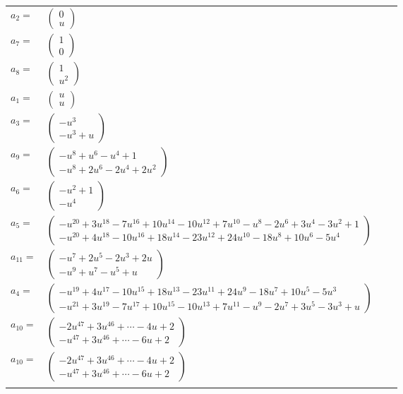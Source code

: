 \documentclass[1p]{elsarticle_modified}
\theoremstyle{definition}
\begin{document}
\begin{tabular}{m{7pt} m{180pt} m{7pt} m{180pt} }
\flushright $a_{2}=$&$\begin{pmatrix}0\\u\end{pmatrix}$ \\
\flushright $a_{7}=$&$\begin{pmatrix}1\\0\end{pmatrix}$ \\
\flushright $a_{8}=$&$\begin{pmatrix}1\\u^2\end{pmatrix}$ \\
\flushright $a_{1}=$&$\begin{pmatrix}u\\u\end{pmatrix}$ \\
\flushright $a_{3}=$&$\begin{pmatrix}- u^3\\- u^3+u\end{pmatrix}$ \\
\flushright $a_{9}=$&$\begin{pmatrix}- u^8+u^6- u^4+1\\- u^8+2 u^6-2 u^4+2 u^2\end{pmatrix}$ \\
\flushright $a_{6}=$&$\begin{pmatrix}- u^2+1\\- u^4\end{pmatrix}$ \\
\flushright $a_{5}=$&$\begin{pmatrix}- u^{20}+3 u^{18}-7 u^{16}+10 u^{14}-10 u^{12}+7 u^{10}- u^8-2 u^6+3 u^4-3 u^2+1\\- u^{20}+4 u^{18}-10 u^{16}+18 u^{14}-23 u^{12}+24 u^{10}-18 u^8+10 u^6-5 u^4\end{pmatrix}$ \\
\flushright $a_{11}=$&$\begin{pmatrix}- u^7+2 u^5-2 u^3+2 u\\- u^9+u^7- u^5+u\end{pmatrix}$ \\
\flushright $a_{4}=$&$\begin{pmatrix}- u^{19}+4 u^{17}-10 u^{15}+18 u^{13}-23 u^{11}+24 u^9-18 u^7+10 u^5-5 u^3\\- u^{21}+3 u^{19}-7 u^{17}+10 u^{15}-10 u^{13}+7 u^{11}- u^9-2 u^7+3 u^5-3 u^3+u\end{pmatrix}$ \\
\flushright $a_{10}=$&$\begin{pmatrix}-2 u^{47}+3 u^{46}+\cdots-4 u+2\\- u^{47}+3 u^{46}+\cdots-6 u+2\end{pmatrix}$\\ \flushright $a_{10}=$&$\begin{pmatrix}-2 u^{47}+3 u^{46}+\cdots-4 u+2\\- u^{47}+3 u^{46}+\cdots-6 u+2\end{pmatrix}$\\&\end{tabular}
\end{document}
